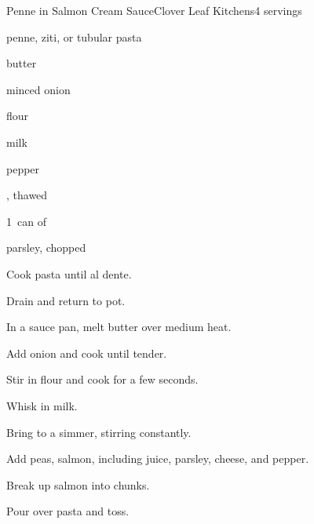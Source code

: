 \begin{recipe}{Penne in Salmon Cream Sauce}{Clover Leaf Kitchens}{4 servings}

\begin{ingredients}
\item {} penne, ziti, or tubular pasta
\item {} butter
\item {} minced onion
\item {} flour
\item \C{1\quarter} milk
\item pepper
\item {} , thawed
\item 1~can of 
\item \C{\quarter} parsley, chopped
\item \C{\quarter} 
\end{ingredients}

\begin{directions}
\item Cook pasta until al dente.
\item Drain and return to pot.
\item In a sauce pan, melt butter over medium heat.
\item Add onion and cook until tender.
\item Stir in flour and cook for a few seconds.
\item Whisk in milk.
\item Bring to a simmer, stirring constantly.
\item Add peas, salmon, including juice, parsley, cheese, and pepper.
\item Break up salmon into chunks.
\item Pour over pasta and toss.
\end{directions}

\end{recipe}
